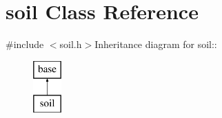 \hypertarget{classsoil}{
\section{soil Class Reference}
\label{classsoil}
}


{\ttfamily \#include $<$soil.h$>$}Inheritance diagram for soil::\begin{figure}[H]
\begin{center}
\leavevmode
\includegraphics[height=2cm]{classsoil}
\end{center}
\end{figure}

